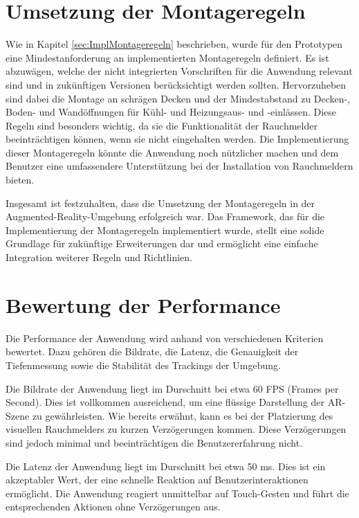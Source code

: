 \section{Umsetzung der Montageregeln}

Wie in Kapitel \ref{sec:ImplMontageregeln} beschrieben, wurde für den Prototypen eine Mindestanforderung an implementierten Montageregeln definiert. Es ist abzuwägen, welche der nicht integrierten Vorschriften für die Anwendung relevant sind und in zukünftigen Versionen berücksichtigt werden sollten. Hervorzuheben sind dabei die Montage an schrägen Decken und der Mindestabstand zu Decken-, Boden- und Wandöffnungen für Kühl- und Heizungsaus- und -einlässen. Diese Regeln sind besonders wichtig, da sie die Funktionalität der Rauchmelder beeinträchtigen können, wenn sie nicht eingehalten werden. Die Implementierung dieser Montageregeln könnte die Anwendung noch nützlicher machen und dem Benutzer eine umfassendere Unterstützung bei der Installation von Rauchmeldern bieten.

Insgesamt ist festzuhalten, dass die Umsetzung der Montageregeln in der Augmented-Reality-Umgebung erfolgreich war. Das Framework, das für die Implementierung der Montageregeln implementiert wurde, stellt eine solide Grundlage für zukünftige Erweiterungen dar und ermöglicht eine einfache Integration weiterer Regeln und Richtlinien.

\section{Bewertung der Performance}

Die Performance der Anwendung wird anhand von verschiedenen Kriterien bewertet. Dazu gehören die Bildrate, die Latenz, die Genauigkeit der Tiefenmessung sowie die Stabilität des Trackings der Umgebung.

Die Bildrate der Anwendung liegt im Durschnitt bei etwa 60 FPS (Frames per Second). Dies ist vollkommen ausreichend, um eine flüssige Darstellung der AR-Szene zu gewährleisten. Wie bereits erwähnt, kann es bei der Platzierung des visuellen Rauchmelders zu kurzen Verzögerungen kommen. Diese Verzögerungen sind jedoch minimal und beeinträchtigen die Benutzererfahrung nicht.

Die Latenz der Anwendung liegt im Durschnitt bei etwa 50 ms. Dies ist ein akzeptabler Wert, der eine schnelle Reaktion auf Benutzerinteraktionen ermöglicht. Die Anwendung reagiert unmittelbar auf Touch-Gesten und führt die entsprechenden Aktionen ohne Verzögerungen aus.

